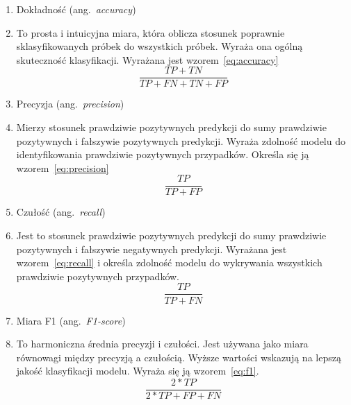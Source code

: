 \begin{enumerate}[label={\alph*)}]
	\item Dokładność (ang.~\emph{accuracy})
    \item [] To prosta i intuicyjna miara, która oblicza stosunek poprawnie sklasyfikowanych próbek do wszystkich próbek.
    Wyraża ona ogólną skuteczność klasyfikacji.
    Wyrażana jest wzorem~\ref{eq:accuracy}
    \begin{equation}
        \frac{TP + TN}{TP + FN + TN + FP}\label{eq:accuracy}
    \end{equation}
    \item Precyzja (ang.~\emph{precision})
    \item [] Mierzy stosunek prawdziwie pozytywnych predykcji do sumy prawdziwie pozytywnych i  fałszywie pozytywnych predykcji.
Wyraża zdolność modelu do identyfikowania prawdziwie pozytywnych przypadków.
Określa się ją wzorem~\ref{eq:precision}
      \begin{equation}
        \frac{TP}{TP + FP}\label{eq:precision}
    \end{equation}
    \item Czułość (ang.~\emph{recall})
    \item [] Jest to stosunek prawdziwie pozytywnych predykcji do sumy prawdziwie pozytywnych i fałszywie negatywnych predykcji.
Wyrażana jest wzorem~\ref{eq:recall} i określa zdolność modelu do wykrywania wszystkich prawdziwie pozytywnych przypadków.
    \begin{equation}
        \frac{TP}{TP + FN}\label{eq:recall}
    \end{equation}
    \item Miara F1 (ang.~\emph{F1-score})
    \item [] To harmoniczna średnia precyzji i czułości.
Jest używana jako miara równowagi między precyzją a czułością.
Wyższe wartości wskazują na lepszą jakość klasyfikacji modelu.
Wyraża się ją wzorem~\ref{eq:f1}.
  \begin{equation}
        \frac{2 * TP}{2 * TP + FP + FN}\label{eq:f1}
    \end{equation}
\end{enumerate}


